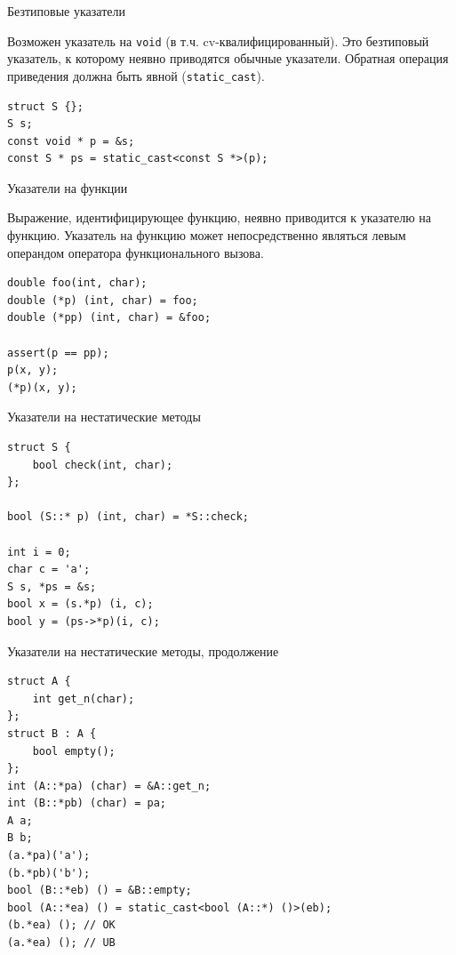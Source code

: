 \documentclass[unknownkeysallowed,xcolor=table]{beamer}
\begin{document}
\begin{frame}[fragile]{Безтиповые указатели}

Возможен указатель на \lstinline{void} (в т.ч. cv-квалифицированный). Это безтиповый указатель, к которому неявно приводятся обычные указатели. Обратная операция приведения должна быть явной (\lstinline{static_cast}).

\vspace{2em}

\begin{lstlisting}
struct S {};
S s;
const void * p = &s;
const S * ps = static_cast<const S *>(p);
\end{lstlisting}

\end{frame}

\begin{frame}[fragile]{Указатели на функции}

Выражение, идентифицирующее функцию, неявно приводится к указателю на функцию. Указатель на функцию может непосредственно являться левым операндом оператора функционального вызова.

\vspace{1em}

\begin{lstlisting}
double foo(int, char);
double (*p) (int, char) = foo;
double (*pp) (int, char) = &foo;

assert(p == pp);
p(x, y);
(*p)(x, y);
\end{lstlisting}

\end{frame}

\begin{frame}[fragile]{Указатели на нестатические методы}

\begin{lstlisting}
struct S {
    bool check(int, char);
};

bool (S::* p) (int, char) = *S::check;

int i = 0;
char c = 'a';
S s, *ps = &s;
bool x = (s.*p) (i, c);
bool y = (ps->*p)(i, c);
\end{lstlisting}

\end{frame}

\begin{frame}[fragile]{Указатели на нестатические методы, продолжение}

\begin{lstlisting}
struct A {
    int get_n(char);
};
struct B : A {
    bool empty();
};
int (A::*pa) (char) = &A::get_n;
int (B::*pb) (char) = pa;
A a;
B b;
(a.*pa)('a');
(b.*pb)('b');
bool (B::*eb) () = &B::empty;
bool (A::*ea) () = static_cast<bool (A::*) ()>(eb);
(b.*ea) (); // OK
(a.*ea) (); // UB
\end{lstlisting}

\end{frame}
\end{document}
